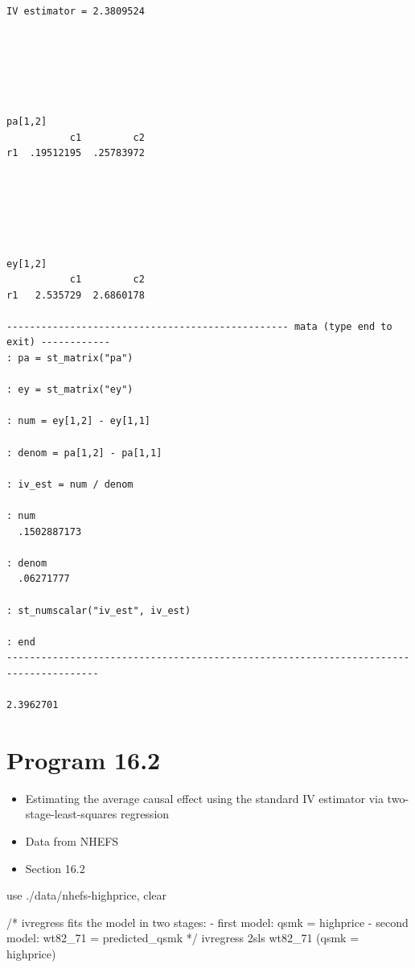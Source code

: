 \documentclass[
  10pt,
  a4paper,
]{book}
\newenvironment{Shaded}{\begin{snugshade}}{\end{snugshade}}
\newcommand{\CommentTok}[1]{\textcolor[rgb]{0.37,0.37,0.37}{#1}}
\newcommand{\KeywordTok}[1]{\textcolor[rgb]{0.00,0.46,0.62}{#1}}
\newcommand{\NormalTok}[1]{\textcolor[rgb]{0.00,0.46,0.62}{#1}}
\providecommand{\tightlist}{%
  \setlength{\itemsep}{0pt}\setlength{\parskip}{0pt}}
\begin{document}
\begin{verbatim}
IV estimator = 2.3809524






pa[1,2]
           c1         c2
r1  .19512195  .25783972






ey[1,2]
           c1         c2
r1   2.535729  2.6860178

------------------------------------------------- mata (type end to exit) ------------
: pa = st_matrix("pa")

: ey = st_matrix("ey")

: num = ey[1,2] - ey[1,1] 

: denom = pa[1,2] - pa[1,1]

: iv_est = num / denom 

: num
  .1502887173

: denom
  .06271777

: st_numscalar("iv_est", iv_est)

: end
--------------------------------------------------------------------------------------

2.3962701
\end{verbatim}

\section{Program 16.2}\label{program-16.2-1}

\begin{itemize}
\tightlist
\item
  Estimating the average causal effect using the standard IV estimator via two-stage-least-squares regression
\item
  Data from NHEFS
\item
  Section 16.2
\end{itemize}

\begin{Shaded}
\begin{Highlighting}[]
\KeywordTok{use}\NormalTok{ ./}\KeywordTok{data}\NormalTok{/nhefs{-}highprice, }\KeywordTok{clear}

\CommentTok{/* ivregress fits the model in two stages:}
\CommentTok{{-} first model: qsmk = highprice}
\CommentTok{{-} second model: wt82\_71 = predicted\_qsmk */}
\NormalTok{ivregress 2sls wt82\_71 (qsmk = highprice)}
\end{Highlighting}
\end{Shaded}
\end{document}
